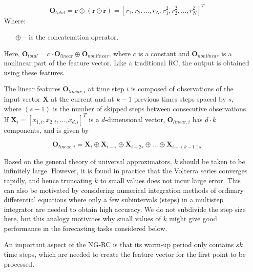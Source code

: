 \documentclass[11pt, oneside]{article}
\begin{document}
\begin{equation}
    \mathbf{O}_{total} = \mathbf{r} \oplus (\mathbf{r} \odot \mathbf{r}) = [r_1, r_2, \ldots, r_N, r_1^2, r_2^2, \ldots, r_N^2]^T
\end{equation}
Where:
\begin{itemize}[noitemsep, leftmargin=4cm, label={}]
    \item [\(\oplus\)] -- is the concatenation operator.
    
\end{itemize}
Here, \(\mathbf{O}_{total} = c \cdot \mathbf{O}_{linear} \oplus \mathbf{O}_{nonlinear}\), where \(c\) is a constant
and \(\mathbf{O}_{nonlinear}\) is a nonlinear part of the feature vector. Like a traditional RC, the output is obtained using these features.

The linear features \(\mathbf{O}_{linear,i}\) at time step \(i\) is composed of observations of the input vector \(\mathbf{X}\) at the current and at \(k-1\) previous times steps spaced by \(s\), where \((s-1)\) is the number of skipped steps between consecutive observations. If \(\mathbf{X}_i = [x_{1,i}, x_{2,i}, \ldots, x_{d,i}]^T\) is a \(d\)-dimensional vector, \(\mathbf{O}_{linear,i}\) has \(d \cdot k\) components, and is given by

\begin{equation}
    \mathbf{O}_{linear,i} = \mathbf{X}_i \oplus \mathbf{X}_{i-s} \oplus \mathbf{X}_{i-2s} \oplus \ldots \oplus \mathbf{X}_{i-(k-1)s}
\end{equation}

Based on the general theory of universal approximators, \(k\) should be taken to be infinitely large. However, it is found in practice that the Volterra series converges rapidly, and hence truncating \(k\) to small values does not incur large error. This can also be motivated by considering numerical integration methods of ordinary differential equations where only a few subintervals (steps) in a multistep integrator are needed to obtain high accuracy. We do not subdivide the step size here, but this analogy motivates why small values of \(k\) might give good performance in the forecasting tasks considered below.

An important aspect of the NG-RC is that its warm-up period only contains \(sk\) time steps, which are needed to create the feature vector for the first point to be processed.
\end{document}
